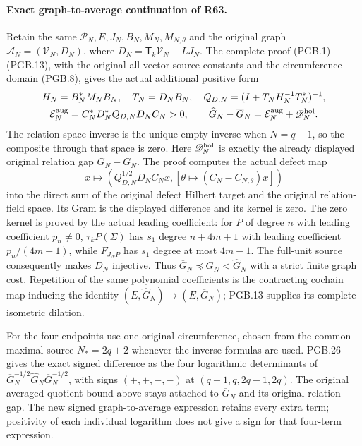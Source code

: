 \paragraph{Exact graph-to-average continuation of R63.}
Retain the same $\mathcal P_N,E,J_N,B_N,M_N,M_{N,\theta}$ and
the original graph $\mathcal A_N=(\mathcal V_N,D_N)$, where
$D_N=\mathsf T_k\mathcal V_N-LJ_N$. The complete proof
(PGB.1)--(PGB.13), with the original all-vector source constants
and the circumference domain (PGB.8), gives the actual additional
positive form
\[
 \begin{gathered}
 H_N=B_N^*M_NB_N,\quad T_N=D_NB_N,\quad
 Q_{D,N}=(I+T_NH_N^{-1}T_N^*)^{-1},\\
 \mathcal E_N^{\rm aug}=C_N^*D_N^*Q_{D,N}D_NC_N>0,\qquad
 \widehat G_N-\overline G_N
     =\mathcal E_N^{\rm aug}+\mathscr D_N^{\rm hol}.
 \end{gathered}
\]
The relation-space inverse is the unique empty inverse when
$N=q-1$, so the composite through that space is zero. Here
$\mathscr D_N^{\rm hol}$ is exactly the already displayed
original relation gap $G_N-\overline G_N$. The proof computes
the actual defect map
\[
 x\longmapsto\left(Q_{D,N}^{1/2}D_NC_Nx,
       [\theta\mapsto(C_N-C_{N,\theta})x]\right)
\]
into the direct sum of the original defect Hilbert target and
the original relation-field space. Its Gram is the displayed
difference and its kernel is zero. The zero kernel is proved
by the actual leading coefficient: for $P$ of degree $n$ with
leading coefficient $p_n\ne0$, $\tau_kP(\Sigma)$ has $s_1$
degree $n+4m+1$ with leading coefficient $p_n/(4m+1)$, while
$F_{J_NP}$ has $s_1$ degree at most $4m-1$.
The full-unit source consequently makes $D_N$ injective.
Thus $\overline G_N\preceq G_N<\widehat G_N$ with a strict
finite graph cost. Repetition of the same polynomial coefficients
is the contracting cochain map inducing the identity
$(E,\widehat G_N)\to(E,\overline G_N)$; PGB.13 supplies its
complete isometric dilation.

For the four endpoints use one original circumference, chosen
from the common maximal source $N_*=2q+2$ whenever the inverse
formulas are used. PGB.26 gives the exact signed difference
as the four logarithmic determinants of
$\overline G_N^{-1/2}\widehat G_N\overline G_N^{-1/2}$,
with signs $(+,+,-,-)$ at $(q-1,q,2q-1,2q)$.
The original averaged-quotient bound above stays attached to
$\overline G_N$ and its original relation gap. The new signed
graph-to-average expression retains every extra term; positivity
of each individual logarithm does not give a sign for that
four-term expression.

